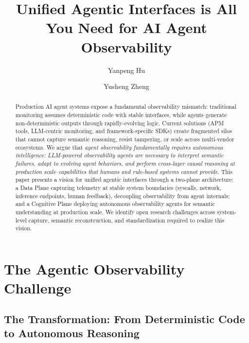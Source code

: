 \documentclass[sigplan,screen,9pt]{acmart}
\begin{document}
\title{Unified Agentic Interfaces is All You Need for AI Agent Observability}

\author{Yanpeng Hu}

\author{Yusheng Zheng}


\sloppy
\begin{abstract}
Production AI agent systems expose a fundamental observability mismatch: traditional monitoring assumes deterministic code with stable interfaces, while agents generate non-deterministic outputs through rapidly-evolving logic. Current solutions (APM tools, LLM-centric monitoring, and framework-specific SDKs) create fragmented silos that cannot capture semantic reasoning, resist tampering, or scale across multi-vendor ecosystems. We argue that \emph{agent observability fundamentally requires autonomous intelligence: LLM-powered observability agents are necessary to interpret semantic failures, adapt to evolving agent behaviors, and perform cross-layer causal reasoning at production scale--capabilities that humans and rule-based systems cannot provide}. This paper presents a vision for unified agentic interfaces through a two-plane architecture: a Data Plane capturing telemetry at stable system boundaries (syscalls, network, inference endpoints, human feedback), decoupling observability from agent internals; and a Cognitive Plane deploying autonomous observability agents for semantic understanding at production scale. We identify open research challenges across system-level capture, semantic reconstruction, and standardization required to realize this vision.
\end{abstract}


\maketitle



\section{The Agentic Observability Challenge}

\subsection{The Transformation: From Deterministic Code to Autonomous Reasoning}
\end{document}
